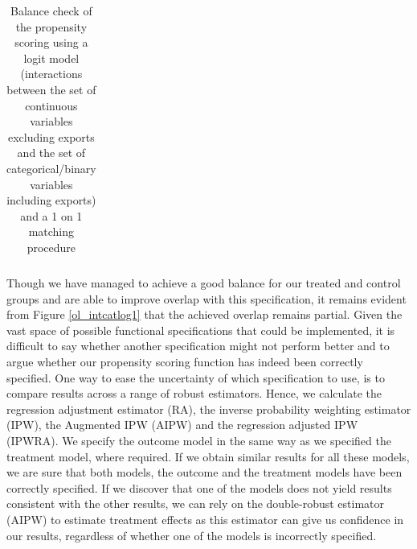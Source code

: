 \begin{table}
	\centering
	\begin{tabular}{lcccc}
		\hline \hline
	
	\hline \hline
	\end{tabular}
	\caption{Balance check of the propensity scoring using a logit model (interactions between the set of continuous variables excluding exports and the set of categorical/binary variables including exports) and a 1 on 1 matching procedure}
	\label{bal_intcatlog1}
\end{table}

Though we have managed to achieve a good balance for our treated and control groups and are able to improve overlap with this specification, it remains evident from Figure \ref{ol_intcatlog1} that the achieved overlap remains partial. Given the vast space of possible functional specifications that could be implemented, it is difficult to say whether another specification might not perform better and to argue whether our propensity scoring function has indeed been correctly specified. One way to ease the uncertainty of which specification to use, is to compare results across a range of robust estimators. Hence, we calculate the regression adjustment estimator (RA), the inverse probability weighting estimator (IPW), the Augmented IPW (AIPW) and the regression adjusted IPW (IPWRA). We specify the outcome model in the same way as we specified the treatment model, where required. If we obtain similar results for all these models, we are sure that both models, the outcome and the treatment models have been correctly specified. If we discover that one of the models does not yield results consistent with the other results, we can rely on the double-robust estimator (AIPW) to estimate treatment effects as this estimator can give us confidence in our results, regardless of whether one of the models is incorrectly specified. 
\\ \par

